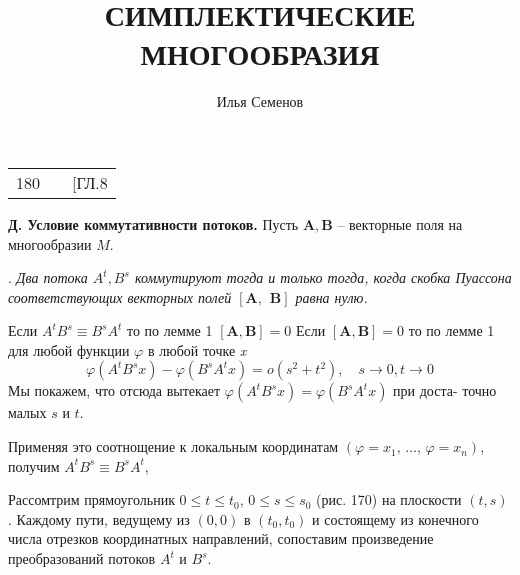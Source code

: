 \documentclass[9pt,a5paper]{article}
\title{СИМПЛЕКТИЧЕСКИЕ МНОГООБРАЗИЯ}
\author{Илья Семенов}
\renewcommand{\leq}{\leqslant}
\begin{document}
	\begin{tabularx}{\textwidth}{m{} C{.6\textwidth} R{.2\textwidth}}
		\footnotesize180& \footnotesize\@title & \footnotesize[ГЛ.8
	\end{tabularx}

	\vspace{10pt}

	\small\textbf{Д. Условие коммутативности потоков. } Пусть $\pmb{A}, \pmb{B}$ -- векторные поля на многообразии $M$.

	\small{}. \textit{Два потока $A^{t}, B^{s}$ коммутируют тогда и только тогда, когда скобка Пуассона соответствующих векторных полей $\pmb{[A,\hspace{5pt} B]}$ равна нулю.}

	\small{} Если $A^{t} B^{s} \equiv B^{s}A^{t}$ то по лемме 1 $\pmb{[A, B]} = 0$ Если $\pmb{[A, B]} = 0$ то по лемме 1 для любой функции $\varphi$ в любой точке \textit{x}
	\[
		\varphi(A^{t}B^{s}x) - \varphi(B^{s}A^{t}x) = o(s^2+t^2), \quad s \xrightarrow{} 0, t \xrightarrow{} 0
	\]
	\small Мы покажем, что отсюда вытекает $\varphi(A^{t}B^{s}x) = \varphi(B^{s}A^{t}x)$ при доста- точно малых $s$ и $t$.
	
	\footnotesize Применяя это соотнощение к локальным координатам $(\varphi = x_1,\,\dots,\,\varphi = x_n)$, получим $A^{t}B^{s} \equiv B^{s}A^{t}$,

	\footnotesize Рассомтрим прямоугольник $0 \leq t \leq t_0$, $0 \leq s \leq s_0$ (рис. 170) на плоскости $(t, s)$.
	Каждому пути, ведущему из $(0, 0)$ в $(t_0, t_0)$ и состоящему из конечного числа отрезков координатных направлений, сопоставим произведение
	преобразований потоков $A^{t}$ и $B^{s}$.
\end{document}
